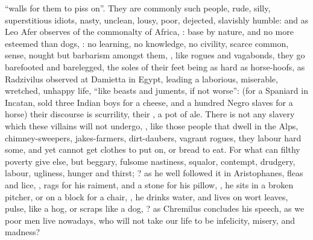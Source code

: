\enquote{walls for them to piss on}. They are commonly such
people, rude, silly, superstitious idiots, nasty, unclean, lousy, poor,
dejected, slavishly humble: and as Leo Afer observes of
the commonalty of Africa, : base by nature, and no
more esteemed than dogs, : no
learning, no knowledge, no civility, scarce common, sense, nought but barbarism
amongst them, ,
like rogues and vagabonds, they go barefooted and barelegged, the soles of
their feet being as hard as horse-hoofs, as Radzivilus
observed at Damietta in Egypt, leading a laborious, miserable, wretched,
unhappy life, \enquote{like beasts and juments, if not worse}:
(for a Spaniard in Incatan, sold three Indian boys for a
cheese, and a hundred Negro slaves for a horse) their discourse is scurrility,
their , a pot of ale. There is not any slavery which these
villains will not undergo, , \etc{} like those people that dwell in the
Alps, chimney-sweepers, jakes-farmers, dirt-daubers,
vagrant rogues, they labour hard some, and yet cannot get clothes to put on, or
bread to eat. For what can filthy poverty give else, but
beggary, fulsome nastiness, squalor, contempt, drudgery,
labour, ugliness, hunger and thirst; ? as
he well followed it in Aristophanes, fleas and lice,
,
rags for his raiment, and a stone for his pillow, , he sits in a broken pitcher, or on a block for a chair, , he drinks water, and lives on wort leaves,
pulse, like a hog, or scraps like a dog, ? as Chremilus concludes his
speech, as we poor men live nowadays, who will not take our life to be
infelicity, misery, and madness?

